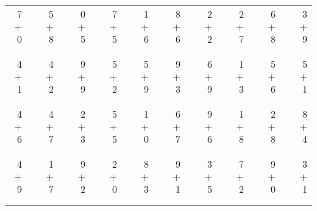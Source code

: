 \documentclass[12pt, letterpaper]{article}
\begin{document}
\begin{tabular}{rrrrrrrrrrrrrrrrrrr}
7 & & 5 & & 0 & & 7 & & 1 & & 8 & & 2 & & 2 & & 6 & & 3\\
$+$ 0 & & $+$ 8 & & $+$ 5 & & $+$ 5 & & $+$ 6 & & $+$ 6 & & $+$ 2 & & $+$ 7 & & $+$ 8 & & $+$ 9\\
\cline{1-1} \cline{3-3} \cline{5-5} \cline{7-7} \cline{9-9} \cline{11-11} \cline{13-13} \cline{15-15} \cline{17-17} \cline{19-19} \\ \\
4 & & 4 & & 9 & & 5 & & 5 & & 9 & & 6 & & 1 & & 5 & & 5\\
$+$ 1 & & $+$ 2 & & $+$ 9 & & $+$ 2 & & $+$ 9 & & $+$ 3 & & $+$ 9 & & $+$ 3 & & $+$ 6 & & $+$ 1\\
\cline{1-1} \cline{3-3} \cline{5-5} \cline{7-7} \cline{9-9} \cline{11-11} \cline{13-13} \cline{15-15} \cline{17-17} \cline{19-19} \\ \\
4 & & 4 & & 2 & & 5 & & 1 & & 6 & & 9 & & 1 & & 2 & & 8\\
$+$ 6 & & $+$ 7 & & $+$ 3 & & $+$ 5 & & $+$ 0 & & $+$ 7 & & $+$ 6 & & $+$ 8 & & $+$ 8 & & $+$ 4\\
\cline{1-1} \cline{3-3} \cline{5-5} \cline{7-7} \cline{9-9} \cline{11-11} \cline{13-13} \cline{15-15} \cline{17-17} \cline{19-19} \\ \\
4 & & 1 & & 9 & & 2 & & 8 & & 9 & & 3 & & 7 & & 9 & & 3\\
$+$ 9 & & $+$ 7 & & $+$ 2 & & $+$ 0 & & $+$ 3 & & $+$ 1 & & $+$ 5 & & $+$ 2 & & $+$ 0 & & $+$ 1\\
\cline{1-1} \cline{3-3} \cline{5-5} \cline{7-7} \cline{9-9} \cline{11-11} \cline{13-13} \cline{15-15} \cline{17-17} \cline{19-19} \\ \\
\end{tabular}
\newpage
\end{document}
